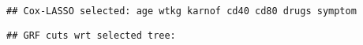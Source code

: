 \documentclass[9pt]{article}
\theoremstyle{definition}
\theoremstyle{remark}
\begin{document}
\begin{knitrout}
\begin{kframe}
\begin{alltt}
 \hlkwb{<-} \hlstd{confounders.name[}\hlopt{$} \hlopt{!=} \hlstd{)]}

\hlstd{(}\hlstd{,}  \hlstd{)}
\end{alltt}
\begin{verbatim}
## Cox-LASSO selected: age wtkg karnof cd40 cd80 drugs symptom
\end{verbatim}
\begin{alltt}
\hlstd{(}\hlstd{,} \hlstd{)}
\end{alltt}
\begin{verbatim}
## GRF cuts wrt selected tree:
\end{verbatim}
\begin{alltt}
\hlopt{$}
\end{alltt}



\end{kframe}
\end{knitrout}
\end{document}
